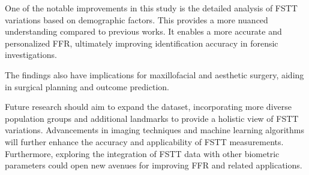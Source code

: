 \documentclass[journal,article,submit,pdftex,moreauthors]{Definitions/mdpi}
\begin{document}
One of the notable improvements in this study is the detailed analysis of FSTT variations based on demographic factors. This provides a more nuanced understanding compared to previous works. It enables a more accurate and personalized FFR, ultimately improving identification accuracy in forensic investigations.

The findings also have implications for maxillofacial and aesthetic surgery, aiding in surgical planning and outcome prediction.

Future research should aim to expand the dataset, incorporating more diverse population groups and additional landmarks to provide a holistic view of FSTT variations. Advancements in imaging techniques and machine learning algorithms will further enhance the accuracy and applicability of FSTT measurements. Furthermore, exploring the integration of FSTT data with other biometric parameters could open new avenues for improving FFR and related applications. 



\end{document}
